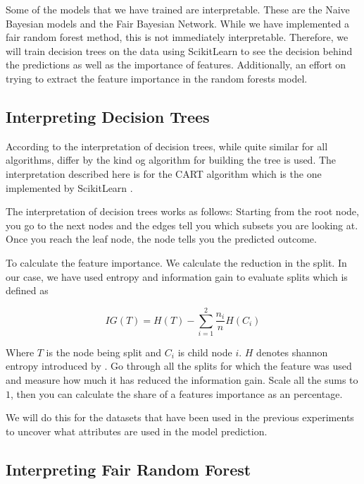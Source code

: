 Some of the models that we have trained are interpretable. These are the Naive Bayesian models and the Fair Bayesian Network. While we have implemented a fair random forest method, this is not immediately interpretable. Therefore, we will train decision trees on the data using ScikitLearn to see the decision behind the predictions as well as the importance of features. Additionally, an effort on trying to extract the feature importance in the random forests model.

\subsection{Interpreting Decision Trees}

According to \citet{Molnar:2020:Book} the interpretation of decision trees, while quite similar for all algorithms, differ by the kind og algorithm for building the tree is used. The interpretation described here is for the CART algorithm which is the one implemented by ScikitLearn \cite{Pedregosa:2011:JMLR}.

The interpretation of decision trees works as follows: Starting from the root node, you go to the next nodes and the edges tell you which subsets you are looking at. Once you reach the leaf node, the node tells you the predicted outcome. \cite{Molnar:2020:Book}

To calculate the feature importance. We calculate the reduction in the split. In our case, we have used entropy and information gain to evaluate splits which is defined as 

\begin{equation*}
    IG(T) = H(T) - \sum_{i = 1}^{2} \frac{n_i}{n} H(C_i)
\end{equation*}

Where $T$ is the node being split and $C_i$ is child node $i$. $H$ denotes shannon entropy introduced by \citet{Shannon:1948:BellSystTechJ}. Go through all the splits for which the feature was used and measure how much it has reduced the information gain. Scale all the sums to $1$, then you can calculate the share of a features importance as an percentage.

We will do this for the datasets that have been used in the previous experiments to uncover what attributes are used in the model prediction.

\subsection{Interpreting Fair Random Forest}




